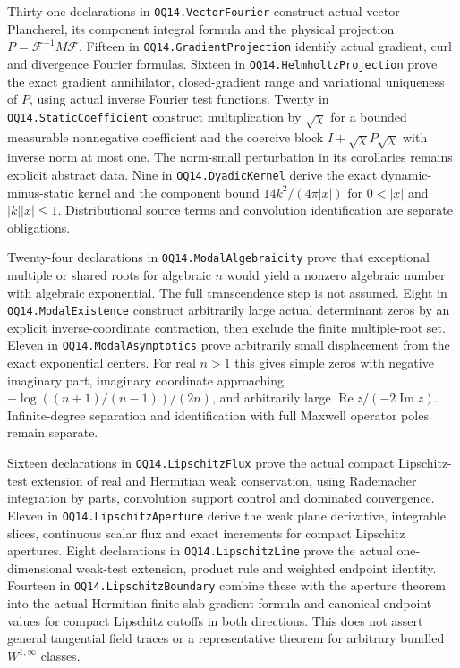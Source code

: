 Thirty-one declarations in \texttt{OQ14.VectorFourier} construct actual
vector Plancherel, its component integral formula and the physical
projection $P=\mathcal F^{-1}M\mathcal F$. Fifteen in
\texttt{OQ14.GradientProjection} identify actual gradient, curl and
divergence Fourier formulas. Sixteen in \texttt{OQ14.HelmholtzProjection}
prove the exact gradient annihilator, closed-gradient range and
variational uniqueness of $P$, using actual inverse Fourier test functions.
Twenty in \texttt{OQ14.StaticCoefficient} construct multiplication by
$\sqrt\chi$ for a bounded measurable nonnegative coefficient and the
coercive block $I+\sqrt\chi P\sqrt\chi$ with inverse norm at most one.
The norm-small perturbation in its corollaries remains explicit abstract
data. Nine in \texttt{OQ14.DyadicKernel} derive the exact dynamic-minus-static
kernel and the component bound $14k^2/(4\pi|x|)$ for $0<|x|$ and
$|k||x|\le1$. Distributional source terms and convolution identification
are separate obligations.

Twenty-four declarations in \texttt{OQ14.ModalAlgebraicity} prove that
exceptional multiple or shared roots for algebraic $n$ would yield a
nonzero algebraic number with algebraic exponential. The full
transcendence step is not assumed. Eight in \texttt{OQ14.ModalExistence}
construct arbitrarily large actual determinant zeros by an explicit
inverse-coordinate contraction, then exclude the finite multiple-root
set. Eleven in \texttt{OQ14.ModalAsymptotics} prove arbitrarily small
displacement from the exact exponential centers. For real $n>1$ this
gives simple zeros with negative imaginary part, imaginary coordinate
approaching $-\log((n+1)/(n-1))/(2n)$, and arbitrarily large
$\operatorname{Re}z/(-2\operatorname{Im}z)$. Infinite-degree separation
and identification with full Maxwell operator poles remain separate.

Sixteen declarations in \texttt{OQ14.LipschitzFlux} prove the actual
compact Lipschitz-test extension of real and Hermitian weak conservation,
using Rademacher integration by parts, convolution support control and
dominated convergence. Eleven in \texttt{OQ14.LipschitzAperture} derive
the weak plane derivative, integrable slices, continuous scalar flux and
exact increments for compact Lipschitz apertures. Eight declarations in
\texttt{OQ14.LipschitzLine} prove the actual one-dimensional weak-test
extension, product rule and weighted endpoint identity. Fourteen in
\texttt{OQ14.LipschitzBoundary} combine these with the aperture theorem
into the actual Hermitian finite-slab gradient formula and canonical
endpoint values for compact Lipschitz cutoffs in both directions. This
does not assert general tangential field traces or a representative
theorem for arbitrary bundled $W^{1,\infty}$ classes.

